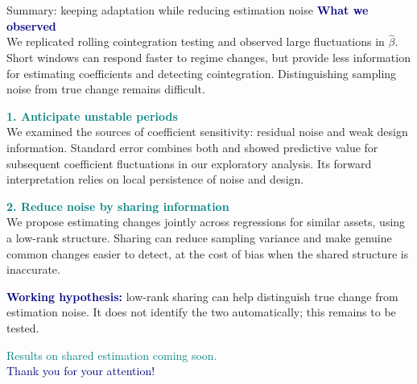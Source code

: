 \documentclass[10pt,aspectratio=169]{beamer}
\begin{document}
\begin{frame}[t]{Summary: keeping adaptation while reducing estimation noise}
\small
\textcolor{navy}{\textbf{What we observed}}\\[.08cm]
We replicated rolling cointegration testing and observed large fluctuations in $\hat\beta$.
Short windows can respond faster to regime changes, but provide less information for estimating coefficients and detecting cointegration. Distinguishing sampling noise from true change remains difficult.

\vspace{.25cm}
\textcolor{teal}{\textbf{1. Anticipate unstable periods}}\\[.08cm]
We examined the sources of coefficient sensitivity: residual noise and weak design information. Standard error combines both and showed predictive value for subsequent coefficient fluctuations in our exploratory analysis. Its forward interpretation relies on local persistence of noise and design.

\vspace{.25cm}
\textcolor{teal}{\textbf{2. Reduce noise by sharing information}}\\[.08cm]
We propose estimating changes jointly across regressions for similar assets, using a low-rank structure. Sharing can reduce sampling variance and make genuine common changes easier to detect, at the cost of bias when the shared structure is inaccurate.

\vspace{.22cm}
\textcolor{navy}{\textbf{Working hypothesis:}} low-rank sharing can help distinguish true change from estimation noise. It does not identify the two automatically; this remains to be tested.

\vfill
\centering
\textcolor{teal}{\normalsize Results on shared estimation coming soon.}\\[.12cm]
\textcolor{navy}{\Large Thank you for your attention!}
\vspace{.12cm}
\end{frame}
\end{document}
